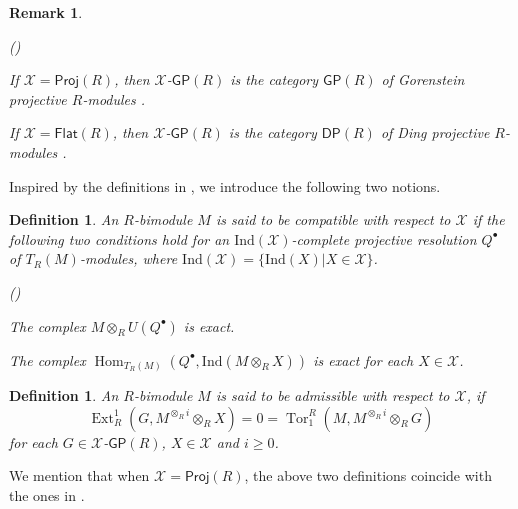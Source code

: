 \documentclass[10pt,twoside]{amsart}
\theoremstyle{bfupright head,slanted body}
\theoremstyle{bfupright head,upright body}
\theoremstyle{fixed bf head,slanted body}
\theoremstyle{fixed bf head,upright body}
\newtheorem{dfn}[res]{Definition}       \newtheorem*{dfn*}{Definition}
\newtheorem{rmk}[res]{Remark}           \newtheorem*{rmk*}{Remark}
\theoremstyle{numbered paragraph}
\newlength{\thmlistleft}        %
\newlength{\thmlistright}       %
\newlength{\thmlistpartopsep}   %
\newlength{\thmlisttopsep}      %
\newlength{\thmlistparsep}      %
\newlength{\thmlistitemsep}     %
\newcounter{prt}
\newenvironment{prt}{\begin{list}{\upshape (\alph{prt})}%
    {\usecounter{prt}%
      \setlength{\leftmargin}{\thmlistleft}%
      \setlength{\labelwidth}{\thmlistleft}%
      \setlength{\rightmargin}{\thmlistright}%
      \setlength{\partopsep}{\thmlistpartopsep}%
      \setlength{\topsep}{\thmlisttopsep}%
      \setlength{\parsep}{\thmlistparsep}%
      \setlength{\itemsep}{\thmlistitemsep}}}%
  {\end{list}}%
\numberwithin{equation}{res}
\newcommand{\GP}{\mathsf{GP}}
\newcommand{\DP}{\mathsf{DP}}
\newcommand{\Proj}{\mathsf{Proj}}
\newcommand{\Flat}{\mathsf{Flat}}
\newcommand{\Ind}{\mathrm{Ind}}
\newcommand{\Hom}{\operatorname{Hom}}
\newcommand{\Ext}{\operatorname{Ext}}
\newcommand{\Tor}{\operatorname{Tor}}
\begin{document}
\begin{rmk}
\begin{prt}
\item[(1)] If $\mathcal{X}=\Proj(R)$, then $\mathcal{X}$-$\GP(R)$ is the category $\GP(R)$ of Gorenstein projective $R$-modules \cite{GHD}.
\item[(2)] If $\mathcal{X}=\Flat(R)$, then $\mathcal{X}$-$\GP(R)$ is the category $\DP(R)$ of Ding projective $R$-modules \cite{DLM, G}.
\end{prt}
\end{rmk}

Inspired by the definitions in \cite{DL}, we introduce the following two notions.

\begin{dfn} \label{dfn of compatible}
An $R$-bimodule $M$ is said to be \emph{compatible with respect to $\mathcal{X}$}
if the following two conditions hold
for an $\Ind(\mathcal{X})$-complete projective resolution $Q^\bullet$ of $T_R(M)$-modules,
where $\Ind(\mathcal{X})= \{ \Ind(X) | X\in \mathcal{X}\}$.
\begin{prt}
\item[(C1)]
The complex $M\otimes_RU(Q^\bullet)$ is exact.
\item[(C2)]
The complex $\Hom_{T_R(M)}(Q^\bullet,\Ind(M\otimes_RX))$ is exact
for each $X \in \mathcal{X}$.
\end{prt}
\end{dfn}

\begin{dfn}
An $R$-bimodule $M$ is said to be \emph{admissible with respect to $\mathcal{X}$}, 
if $$\Ext_R^1(G,M^{\otimes_Ri}\otimes_R X)=0=\Tor^R_1(M, M^{\otimes_Ri}\otimes_R G)$$
for each $G \in \mathcal{X}$-$\GP(R)$, $X \in \mathcal{X}$ and $i\geqslant 0$.
\end{dfn}

We mention that when $\mathcal{X}=\Proj(R)$, the above two definitions coincide with the ones in \cite{DL}.


\end{document}
